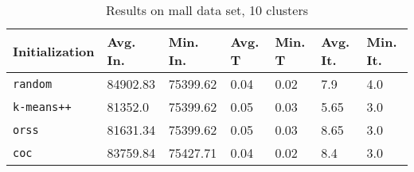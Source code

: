 \begin{table}[h]
	\begin{center}
		\begin{tabular}{|l|l|l|l|l|l|l|}
			\hline
			Initialization & Avg. In. & Min. In. & Avg. T & Min. T & Avg. It. & Min. It.\\\hline
			\texttt{random} & 84902.83 & 75399.62 & 0.04 & 0.02 & 7.9 & 4.0\\\hline
			\texttt{k-means++} & 81352.0 & 75399.62 & 0.05 & 0.03 & 5.65 & 3.0\\\hline
			\texttt{orss} & 81631.34 & 75399.62 & 0.05 & 0.03 & 8.65 & 3.0\\\hline
			\texttt{coc} & 83759.84 & 75427.71 & 0.04 & 0.02 & 8.4 & 3.0\\\hline
		\end{tabular}
		\caption{Results on mall data set, 10 clusters}
		\label{tbl:mall10}
	\end{center}
\end{table}

